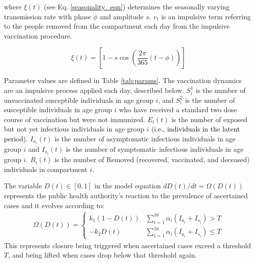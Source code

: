 where $\xi(t)$ (see Eq. \ref{seasonality_eqn}) determines the seasonally varying transmission rate with phase $\phi$ and amplitude $s$. $v_t$ is an impulsive term referring to the people removed from the compartment each day from the impulsive vaccination procedure.

\begin{equation}
  \xi(t) = \left[1 - s \cos\left(\frac{2 \pi}{365} (t - \phi) \right)\right]
  \label{seasonality_eqn}
\end{equation}


\noindent Parameter values are defined in Table \ref{tab:params}. The vaccination dynamics are an impulsive process applied each day, described below. $S^{1}_i$ is the number of unvaccinated susceptible individuals in age group $i$, and $S^{2}_i$ is the number of susceptible individuals in age group $i$ who have received a standard two dose course of vaccination but were not immunized. $E_i(t)$ is the number of exposed but not yet infectious individuals in age group $i$ (\textcolor{black}{i.e., individuals in the latent period}). $I_{a_i}(t)$ is the number of asymptomatic infectious individuals in age group $i$ and $I_{s_i}(t)$ is the number of symptomatic infectious individuals in age group $i$. $R_i(t)$ is the number of Removed (recovered, vaccinated, and deceased) individuals in compartment $i$.

The variable $D(t) \in [0,1]$ in the model equation $dD(t)/dt = \Omega(D(t))$ represents the public health authority's reaction to the prevalence of ascertained cases and it evolves according to: 
\begin{eqnarray}
  \Omega(D(t)) =  \left\{
\begin{array}{ll}
    k_1 (1 - D(t)) &  \sum_{i=1}^{16}\alpha_i(I_{a_i} + I_{s_i}) > T\\
    - k_2 D(t) & \sum_{i=1}^{16}\alpha_i(I_{a_i} + I_{s_i}) \leq T
\end{array} 
\right. 
\label{shutdown}
\end{eqnarray}
This represents closure being triggered when ascertained cases exceed a threshold $T$, and being lifted when cases drop below that threshold again. 

